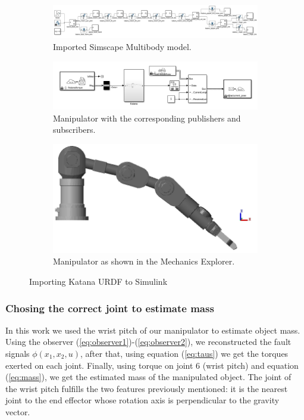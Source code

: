 \documentclass[a4paper, 10pt]{article}
\begin{document}
\begin{figure}
  \centering
  \begin{subfigure}[b]{\textwidth}
    \centering
    \includegraphics[width=\textwidth]{Figures/KatanaSimscape.png}
    \caption{Imported Simscape Multibody model.}
    \label{fig:KatanaSimulinkA}
  \end{subfigure}
  \begin{subfigure}[b]{0.75\textwidth}
    \centering
    \includegraphics[width=\textwidth]{Figures/KatanaSimulinkROS.png}
    \caption{Manipulator with the corresponding publishers and subscribers.}
    \label{fig:KatanaSimulinkB}
  \end{subfigure}
  \begin{subfigure}[b]{0.55\textwidth}
    \centering
    \includegraphics[width=\textwidth]{Figures/KatanaMechanics.png}
    \caption{Manipulator as shown in the Mechanics Explorer.}
    \label{fig:KatanaSimulinkC}
  \end{subfigure}
  \caption{Importing Katana URDF to Simulink}
  \label{fig:KatanaSimulink}
\end{figure}

\subsubsection*{Chosing the correct joint to estimate mass}
In this work we used the wrist pitch of our manipulator to estimate object mass. Using the observer (\ref{eq:observer1})-(\ref{eq:observer2}), we reconstructed the fault signals $\phi(x_1, x_2, u)$, after that, using equation (\ref{eq:taus}) we get the torques exerted on each joint. Finally, using torque on joint 6 (wrist pitch) and equation (\ref{eq:mass}), we get the estimated mass of the manipulated object. The joint of the wrist pitch fulfills the two features previously mentioned: it is the nearest joint to the end effector whose rotation axis is perpendicular to the gravity vector.
\end{document}
